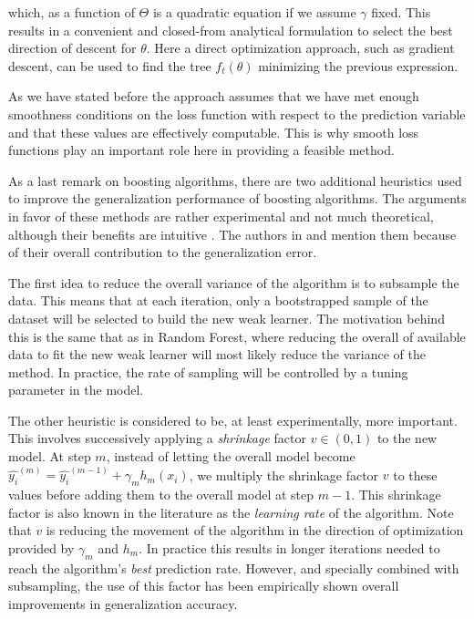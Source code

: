 which, as a function of $\Theta$ is a quadratic equation if we assume $\gamma$ fixed. This results in a convenient and closed-from analytical formulation to select the best direction of descent for $\theta$. Here a direct optimization approach, such as gradient descent, can be used to find the tree $f_t(\theta)$ minimizing the previous expression.

As we have stated before the approach assumes that we have met enough smoothness conditions on the loss function with respect to the prediction variable 
and that these values are effectively computable. This is why smooth loss functions play an important role here in providing a feasible method. 




As a last remark on boosting algorithms, there are two additional heuristics used to improve the generalization performance of boosting algorithms. The arguments in favor of these methods are rather experimental and not much theoretical, although their benefits are intuitive . The authors in \cite{hastie-elemstatslearn} and \cite{bishop - patternRecognition} mention them because of their overall contribution to the generalization error.

The first idea to reduce the overall variance of the algorithm is to subsample the data. This means that at each iteration, only a bootstrapped sample of the dataset will be selected to build the new weak learner. The motivation behind this is the same that as in Random Forest, where reducing the overall of available data to fit the new weak learner will most likely reduce the variance of the method. In practice, the rate of sampling will be controlled by a tuning parameter in the model.

The other heuristic is considered to be, at least experimentally, more important. This involves successively applying a \textit{shrinkage} factor $v \in  (0,1)$ to the new model.  At step $m$, instead of letting the overall model become $ \hat{y_i}^{(m)} = \hat{y_i}^{(m-1)} +  \gamma_m h_m(x_i) $, we multiply the shrinkage factor $v$ to these values before adding them to the overall model at step $m-1$. This shrinkage factor is also known in the literature as the \textit{learning rate} of the algorithm.  Note that $v$  is reducing the movement of the algorithm in the direction of optimization provided by $\gamma_m$ and $h_m$. In practice this results in longer iterations needed to reach the algorithm's \textit{best} prediction rate. However, and specially combined with subsampling, the use of this factor has been empirically shown overall improvements in generalization accuracy.
